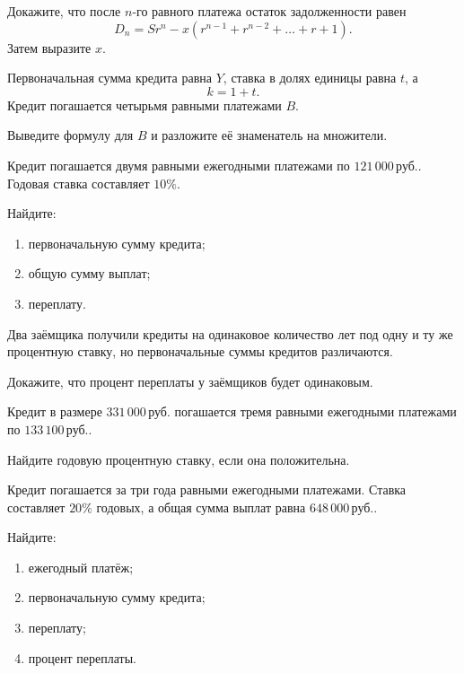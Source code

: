 \documentclass[a4paper,12pt]{article}
\newcommand{\rub}{\,\text{руб.}}
\begin{document}
\begin{training}[resume]
  \item
  Докажите, что после \(n\)-го равного платежа остаток задолженности равен
  \[
  D_n
  =
  Sr^n-x\left(r^{n-1}+r^{n-2}+\dots+r+1\right).
  \]
  Затем выразите \(x\).

  \item
  Первоначальная сумма кредита равна \(Y\), ставка в долях единицы равна
  \(t\), а
  \[
  k=1+t.
  \]
  Кредит погашается четырьмя равными платежами \(B\).

  Выведите формулу для \(B\) и разложите её знаменатель на множители.

  \item
  Кредит погашается двумя равными ежегодными платежами по
  \(121\,000\rub\). Годовая ставка составляет \(10\%\).

  Найдите:
  \begin{enumerate}[label=\alph*),leftmargin=2em]
    \item первоначальную сумму кредита;
    \item общую сумму выплат;
    \item переплату.
  \end{enumerate}

  \item
  Два заёмщика получили кредиты на одинаковое количество лет под одну и ту
  же процентную ставку, но первоначальные суммы кредитов различаются.

  Докажите, что процент переплаты у заёмщиков будет одинаковым.

  \item
  Кредит в размере \(331\,000\rub\) погашается тремя равными ежегодными
  платежами по \(133\,100\rub\).

  Найдите годовую процентную ставку, если она положительна.

  \item
  Кредит погашается за три года равными ежегодными платежами. Ставка
  составляет \(20\%\) годовых, а общая сумма выплат равна
  \(648\,000\rub\).

  Найдите:
  \begin{enumerate}[label=\alph*),leftmargin=2em]
    \item ежегодный платёж;
    \item первоначальную сумму кредита;
    \item переплату;
    \item процент переплаты.
  \end{enumerate}
\end{training}
\end{document}
